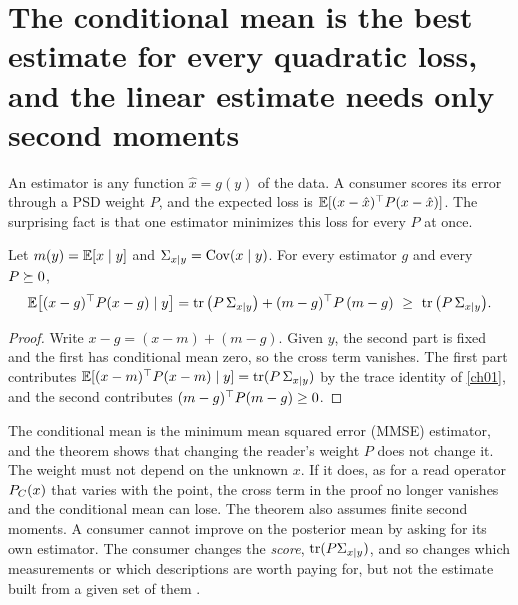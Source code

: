 
\section{The conditional mean is the best estimate for every quadratic loss, and the linear estimate needs only second moments}\label{sec:ch02:mmse}

An estimator is any function $\hat x=g(y)$ of the data. A consumer scores its
error through a PSD weight $P$, and the expected loss is
$\mathbb{E}[(x-\hat x)^{\top} P(x-\hat x)]$. The surprising fact is that one estimator
minimizes this loss for every $P$ at once.

\begin{theorem}\label{thm:ch02:mmse}
Let $m(y)=\mathbb{E}[x\mid y]$ and $\Sigma_{x\mid y}=\operatorname{Cov}(x\mid y)$. For every
estimator $g$ and every $P\succeq0$,
\begin{equation}\label{eq:ch02:mmse}
\E\big[(x-g)\T P(x-g)\mid y\big]
=\tr\big(P\,\Sigma_{x\mid y}\big)+(m-g)\T P\,(m-g)\ \ge\ \tr\big(P\,\Sigma_{x\mid y}\big).
\end{equation}
\end{theorem}

\begin{proof}
Write $x-g=(x-m)+(m-g)$. Given $y$, the second part is fixed and the first has
conditional mean zero, so the cross term vanishes. The first part contributes
$\mathbb{E}[(x-m)^{\top} P(x-m)\mid y]=\operatorname{tr}(P\,\Sigma_{x\mid y})$ by the trace identity of
\cref{ch01}, and the second contributes $(m-g)^{\top} P(m-g)\ge0$.
\end{proof}

The conditional mean is the minimum mean squared error (MMSE) estimator, and
the theorem shows that changing the reader's weight $P$ does not change it. The
weight must not depend on the unknown $x$. If it does, as for a read operator
$P_C(x)$ that varies with the point, the cross term in the proof no longer
vanishes and the conditional mean can lose. The theorem also assumes finite
second moments. A
consumer cannot improve on the posterior mean by asking for its own estimator.
The consumer changes the \emph{score}, $\operatorname{tr}(P\Sigma_{x\mid y})$, and so changes
which measurements or which descriptions are worth paying for, but not the
estimate built from a given set of them \cite{kay1993}.

